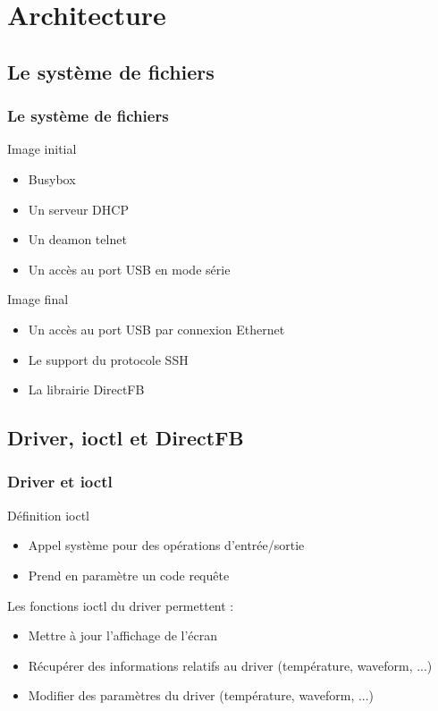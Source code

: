 \section{Architecture}
\subsection{Le système de fichiers}
\begin{frame}
\frametitle{Le système de fichiers}

\begin{block}{Image initial}
\begin{itemize}
\item Busybox
\item Un serveur DHCP
\item Un deamon telnet
\item Un accès au port USB en mode série 
\end{itemize}
\end{block}

\begin{block}{Image final}
\begin{itemize}
\item Un accès au port USB par connexion Ethernet
\item Le support du protocole SSH
\item La librairie DirectFB
\end{itemize}
\end{block}

\end{frame}

\subsection{Driver, ioctl et DirectFB}

\begin{frame}
\frametitle{Driver et ioctl}

\begin{block}{Définition ioctl}
\begin{itemize}
\item Appel système pour des opérations d'entrée/sortie
\item Prend en paramètre un code requête
\end{itemize}
\end{block}
\begin{block}{Les fonctions ioctl du driver permettent :}
\begin{itemize}
\item Mettre à jour l'affichage de l'écran
\item Récupérer des informations relatifs au driver (température, waveform, ...)
\item Modifier des paramètres du driver (température, waveform, ...)
\end{itemize}
\end{block}

\end{frame}

